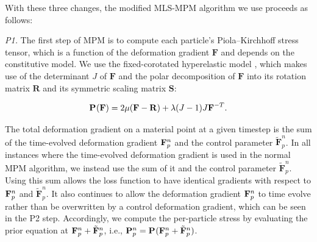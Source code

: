 With these three changes, the modified {MLS-MPM} algorithm we use proceeds as follows:



\newcommand{\Fc}[2]{\tilde{\mathbf{F}}_{#1} ^{#2} }

\newcommand{\dip}[1]{\mathbf{d}_{i p} ^{#1} }
\newcommand{\x}[2]{\mathbf{x}_{#1} ^{#2} }
\newcommand{\wip}[1]{w_{i p} ^{#1} }
\newcommand{\gridp}[1]{\mathbf{p}_i ^{#1} }
\newcommand{\dt}{\Delta t}
\newcommand{\damp}{\zeta}
\newcommand{\dx}{\Delta x}
\newcommand{\C}[2]{\mathbf{C}_{#1} ^{#2} }
\newcommand{\G}[2]{\mathbf{G}_{#1} ^{#2} }
\newcommand{\initialvol}[1]{V_{#1} ^0 }
\newcommand{\vel}[2]{\mathbf{v}_{#1} ^{#2} }
\newcommand{\fext}{\mathbf{f}_{\text{ext}} }

\emph{P1.} The first step of {MPM} is to compute each particle's Piola--Kirchhoff stress tensor, which is a function of the deformation gradient $\mathbf{F}$ and depends on the constitutive model.
We use the fixed-corotated hyperelastic model \citep{stomakhin2012energetically, jiang2016material}, which makes use of the determinant $J$ of $\mathbf{F}$ and the polar decomposition \citep{gast2016implicit} of $\mathbf{F}$ into its rotation matrix $\mathbf{R}$ and its symmetric scaling matrix $\mathbf{S}$:

    \begin{equation}
    \mathbf{P}_{ } ^{ }(\mathbf{F}) = 2 \mu (\mathbf{F} - \mathbf{R}) + \lambda  (J - 1)  J  \mathbf{F}^{-T} .
    \end{equation}
    
The total deformation gradient on a material point at a given timestep is the sum of the time-evolved deformation gradient $\mathbf{F}_{p} ^{n}$ and the control parameter $\Fc{p}{n}$.
In all instances where the time-evolved deformation gradient is used in the normal MPM algorithm, we instead use the sum of it and the control parameter $\Fc{p}{n}$.
Using this sum allows the loss function to have identical gradients with respect to $\mathbf{F}_{p} ^{n}$ and $\Fc{p}{n}$.
It also continues to allow the deformation gradient $\mathbf{F}_{p} ^{n}$ to time evolve rather than be overwritten by a control deformation gradient, which can be seen in the P2 step.
Accordingly, we compute the per-particle stress by evaluating the prior equation at $\F{p}{n} + \Fc{p}{n}$, i.e., $\PK{p}{n} = \PK{ }{ } (\F{p}{n} + \Fc{p}{n})$.


